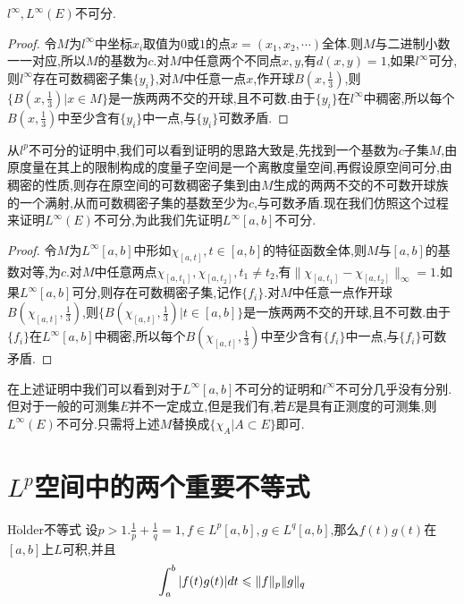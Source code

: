 \documentclass[lang=cn,18pt]{elegantbook}
\begin{document}
\begin{theorem}
    $l^{\infty},L^{\infty}(E)$不可分.
\end{theorem}
\begin{proof}
    令$M$为$l^{\infty}$中坐标$x_i$取值为$0$或$1$的点$x=(x_1,x_2,\cdots)$全体.则$M$与二进制小数一一对应,所以$M$的基数为$c$.对$M$中任意两个不同点$x,y$,有$d(x,y)=1$,如果$l^{\infty}$可分,则$l^{\infty}$存在可数稠密子集$\{y_i\}$,对$M$中任意一点$x$,作开球$B(x,\frac{1}{3})$,则$\{B(x,\frac{1}{3})|x \in M \}$是一族两两不交的开球,且不可数.由于$\{y_i\}$在$l^{\infty}$中稠密,所以每个$B(x,\frac{1}{3})$中至少含有$\{y_i\}$中一点,与$\{y_i\}$可数矛盾.
\end{proof}
\begin{note}
    从$l^p$不可分的证明中,我们可以看到证明的思路大致是,先找到一个基数为$c$子集$M$,由原度量在其上的限制构成的度量子空间是一个离散度量空间,再假设原空间可分,由稠密的性质,则存在原空间的可数稠密子集到由$M$生成的两两不交的不可数开球族的一个满射,从而可数稠密子集的基数至少为$c$,与可数矛盾.现在我们仿照这个过程来证明$L^{\infty}(E)$不可分,为此我们先证明$L^{\infty}[a,b]$不可分.
\end{note}
\begin{proof}
    令$M$为$L^{\infty}[a,b]$中形如$\chi_{[a,t]},t \in [a,b]$的特征函数全体,则$M$与$[a,b]$的基数对等,为$c$.对$M$中任意两点$\chi_{[a,t_1]},\chi_{[a,t_2]},t_1 \not= t_2$,有$\|\chi_{[a,t_1]}-\chi_{[a,t_2]}\|_{\infty}=1$.如果$L^{\infty}[a,b]$可分,则存在可数稠密子集,记作$\{f_i\}$.对$M$中任意一点作开球$B(\chi_{[a,t]},\frac{1}{3})$,则$\{B(\chi_{[a,t]},\frac{1}{3})|t \in [a,b]\}$是一族两两不交的开球,且不可数.由于$\{f_i\}$在$L^{\infty}[a,b]$中稠密,所以每个$B(\chi_{[a,t]},\frac{1}{3})$中至少含有$\{f_i\}$中一点,与$\{f_i\}$可数矛盾.
\end{proof}
\begin{note}
    在上述证明中我们可以看到对于$L^{\infty}[a,b]$不可分的证明和$l^{\infty}$不可分几乎没有分别.但对于一般的可测集$E$并不一定成立,但是我们有,若$E$是具有正测度的可测集,则$L^{\infty}(E)$不可分.只需将上述$M$替换成$\{\chi_{A}|A \subset E\}$即可.
\end{note}



\section{$L^p$空间中的两个重要不等式}
\begin{theorem}{H$\ddot{\text{o}}$lder不等式}
    设$p > 1.\frac{1}{p}+\frac{1}{q}=1,f \in L^p[a,b],g\in L^q[a,b]$,那么$f(t)g(t)$在$[a,b]$上$L$可积,并且
    $$\int^{b}_{a}|f(t)g(t)|dt \leqslant \Arrowvert f \Arrowvert_p \Arrowvert g \Arrowvert_q$$
\end{theorem}
\end{document}
